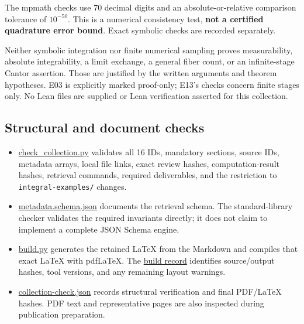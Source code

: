 \documentclass[
  11pt,
]{article}
\providecommand{\tightlist}{%
  \setlength{\itemsep}{0pt}\setlength{\parskip}{0pt}}
\begin{document}
The mpmath checks use 70 decimal digits and an absolute-or-relative
comparison tolerance of \(10^{-50}\). This is a numerical consistency
test, \textbf{not a certified quadrature error bound}. Exact symbolic
checks are recorded separately.

Neither symbolic integration nor finite numerical sampling proves
measurability, absolute integrability, a limit exchange, a general fiber
count, or an infinite-stage Cantor assertion. Those are justified by the
written arguments and theorem hypotheses. E03 is explicitly marked
proof-only; E13's checks concern finite stages only. No Lean files are
supplied or Lean verification asserted for this collection.

\subsection{Structural and document
checks}\label{structural-and-document-checks}

\begin{itemize}
\tightlist
\item
  \href{https://github.com/Drsunflowerherbert/Codex-for-Math/tree/codex/integral-examples-2026-10-15/integral-examples/checks/check_collection.py}{check\_collection.py}
  validates all 16 IDs, mandatory sections, source IDs, metadata arrays,
  local file links, exact review hashes, computation-result hashes,
  retrieval commands, required deliverables, and the restriction to
  \texttt{integral-\allowbreak{}examples/\allowbreak{}} changes.
\item
  \href{https://github.com/Drsunflowerherbert/Codex-for-Math/tree/codex/integral-examples-2026-10-15/integral-examples/metadata.schema.json}{metadata.schema.json}
  documents the retrieval schema. The standard-library checker validates
  the required invariants directly; it does not claim to implement a
  complete JSON Schema engine.
\item
  \href{https://github.com/Drsunflowerherbert/Codex-for-Math/tree/codex/integral-examples-2026-10-15/integral-examples/build.py}{build.py}
  generates the retained LaTeX from the Markdown and compiles that exact
  LaTeX with pdfLaTeX. The
  \href{https://github.com/Drsunflowerherbert/Codex-for-Math/tree/codex/integral-examples-2026-10-15/integral-examples/checks/pdf-build.json}{build
  record} identifies source/output hashes, tool versions, and any
  remaining layout warnings.
\item
  \href{https://github.com/Drsunflowerherbert/Codex-for-Math/tree/codex/integral-examples-2026-10-15/integral-examples/checks/collection-check.json}{collection-check.json}
  records structural verification and final PDF/LaTeX hashes. PDF text
  and representative pages are also inspected during publication
  preparation.
\end{itemize}
\end{document}
